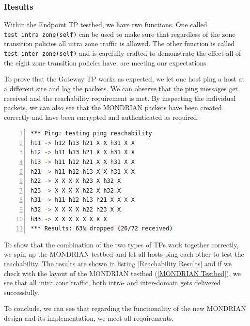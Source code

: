 
\subsubsection{Results}
Within the Endpoint \acs{TP} testbed, we have two functions. One called \texttt{test_intra_zone(self)} can be used to make sure that regardless of the zone transition policies all intra zone traffic is allowed. The other function is called \texttt{test_inter_zone(self)} and is carefully crafted to demonstrate the effect all of the eight zone transition policies have, are meeting our expectations.

To prove that the Gateway \acs{TP} works as expected, we let one host ping a host at a different site and log the packets. We can observe that the ping messages get received and the reachability requirement is met. By inspecting the individual packets, we can also see that the MONDRIAN packets have been created correctly and have been encrypted and authenticated as required.


\begin{lstlisting}[language=sh, caption = Ping Reachability Results (X indicating failure / host name indicating success), captionpos=b, numbers=left, frame=single, breaklines=true, breakatwhitespace=true, showstringspaces=false, label=Reachability Results]
*** Ping: testing ping reachability
h11 -> h12 h13 h21 X X h31 X X 
h12 -> h11 h13 h21 X X h31 X X 
h13 -> h11 h12 h21 X X h31 X X 
h21 -> h11 h12 h13 X X h31 X X 
h22 -> X X X X h23 X h32 X 
h23 -> X X X X h22 X h32 X 
h31 -> h11 h12 h13 h21 X X X X 
h32 -> X X X X h22 h23 X X 
h33 -> X X X X X X X X 
*** Results: 63% dropped (26/72 received)
\end{lstlisting}

To show that the combination of the two types of \acsp{TP} work together correctly, we spin up the MONDRIAN testbed and let all hosts ping each other to test the reachability. The results are shown in listing \ref{Reachability Results} and if we check with the layout of the MONDRIAN testbed (\ref{MONDRIAN Testbed}), we see that all intra zone traffic, both intra- and inter-domain gets delivered successfully.

To conclude, we can see that regarding the functionality of the new MONDRIAN design and its implementation, we meet all requirements.


